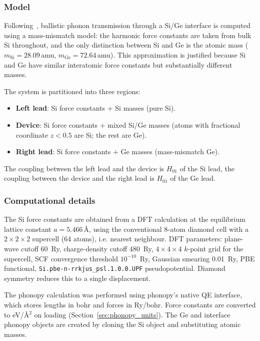 \subsubsection{Model}

Following~\cite{guo_quantum_2020,latour_ab_2017,tian_enhancing_2012},
ballistic phonon transmission through a Si/Ge interface is computed
using a mass-mismatch model: the harmonic force constants are taken
from bulk Si throughout, and the only distinction between Si and Ge is
the atomic mass ($m_\text{Si} = 28.09$\,amu,
$m_\text{Ge} = 72.64$\,amu).  This approximation is justified because
Si and Ge have similar interatomic force constants but substantially
different masses.

The system is partitioned into three regions:
\begin{itemize}
  \item \textbf{Left lead}: Si force constants + Si masses (pure Si).
  \item \textbf{Device}: Si force constants + mixed Si/Ge masses
        (atoms with fractional coordinate $z < 0.5$ are Si; the rest
        are Ge).
  \item \textbf{Right lead}: Si force constants + Ge masses
        (mass-mismatch Ge).
\end{itemize}
The coupling between the left lead and the device is $H_{01}$ of the
Si lead, the coupling between the device and the right lead is
$H_{01}$ of the Ge lead.

\subsubsection{Computational details}

The Si force constants are obtained from a DFT calculation at the
equilibrium lattice constant $a = 5.466$\,\AA, using the conventional
8-atom diamond cell with a $2\times2\times2$ supercell (64 atoms), i.e.
nearest neighbour. DFT parameters: plane-wave cutoff 60~Ry, charge-density cutoff
480~Ry, $4\times4\times4$ $k$-point grid for the supercell, SCF
convergence threshold $10^{-10}$~Ry, Gaussian smearing 0.01~Ry, PBE
functional, \texttt{Si.pbe-n-rrkjus\_psl.1.0.0.UPF} pseudopotential.
Diamond symmetry reduces this to a single displacement.

The phonopy calculation was performed using phonopy's native QE
interface, which stores lengths in bohr and forces in Ry/bohr.  Force
constants are converted to eV/\AA$^2$ on loading
(Section~\ref{sec:phonopy_units}).  The Ge and interface phonopy
objects are created by cloning the Si object and substituting atomic
masses.


